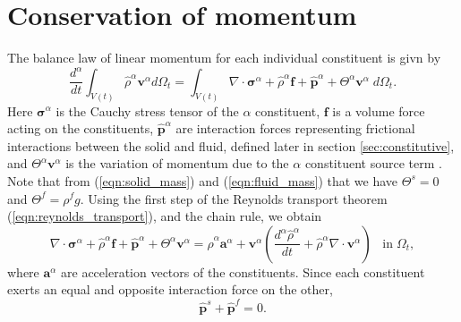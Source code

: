 \section{Conservation of momentum}
The balance law of linear momentum for each individual constituent is givn by
\begin{equation}
\frac{d^{\alpha}}{dt} \int_{V(t)} \hat\rho^{\alpha}\boldsymbol{v}^{\alpha} d\Omega_{t} =\int_{V(t)} \nabla \cdot \boldsymbol\sigma^{\alpha} + \hat\rho^{\alpha} {\boldsymbol{f}} + \hat{\boldsymbol{p}}^{\alpha}  + \Theta^{\alpha}\boldsymbol{v}^{\alpha} \; d\Omega_{t}.
\label{eqn:momentum_alpha_axium}
\end{equation}
Here $\boldsymbol\sigma^{\alpha}$ is the Cauchy stress tensor of the $\alpha$ constituent, $\boldsymbol{f}$ is a volume force acting on the constituents, $\hat{\boldsymbol{p}}^{\alpha}$ are interaction forces representing frictional interactions between the solid and fluid, defined later in section \ref{sec:constitutive}, and  $\Theta^{\alpha}\boldsymbol{v}^{\alpha} $ is the variation of momentum due to the $\alpha$ constituent source term \cite{chapelle2014general}. Note that from (\ref{eqn:solid_mass}) and (\ref{eqn:fluid_mass}) that we have $\Theta^{s}=0$ and $\Theta^{f}=\rho^{f}g$. Using the first step of the Reynolds transport theorem (\ref{eqn:reynolds_transport}), and the chain rule, we obtain %
\begin{equation}
\nabla \cdot \boldsymbol\sigma^{\alpha} + \hat\rho^{\alpha}\boldsymbol{f} + \hat{\boldsymbol{p}}^{\alpha}+\Theta^{\alpha}\boldsymbol{v}^{\alpha}=\hat\rho^{\alpha}\boldsymbol{a}^{\alpha} +  \boldsymbol{v}^{\alpha}\left(  \frac{d^{\alpha}\hat{\rho}^{\alpha}  }{dt}  + \hat{\rho}^{\alpha}  \nabla \cdot \boldsymbol{v}^{\alpha} \right)\;\;\;\mbox{in}\;\Omega_{t},
\label{eqn:momentum_alpha}
\end{equation}
where $\boldsymbol{a}^{\alpha}$ are acceleration vectors of the constituents. Since each constituent exerts an equal and opposite interaction force on the other, 
\begin{equation}
 \hat{\boldsymbol{p}}^{s}+\hat{\boldsymbol{p}}^{f}=0.
\end{equation}


